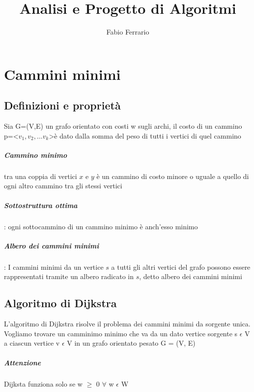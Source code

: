 \documentclass[12pt, a4paper, openany, twoside]{book}
\begin{document}
\author{Fabio Ferrario}
\title{Analisi e Progetto di Algoritmi}
\maketitle

\tableofcontents

\chapter*{Cammini minimi}

\section{Definizioni e proprietà}
Sia G=(V,E) un grafo orientato con costi w sugli archi, 
il costo di un cammino p=\textless$ v_1,v_2,...v_k$\textgreater è dato
dalla somma del peso di tutti i vertici di quel cammino

\paragraph*{Cammino minimo} tra una coppia di vertici $x$ e $y$ è un cammino di costo
minore o uguale a quello di ogni altro cammino tra gli stessi vertici

\paragraph*{Sottostruttura ottima}: ogni sottocammino di un cammino minimo è anch'esso minimo

\paragraph*{Albero dei cammini minimi}: I cammini minimi da un vertice $s$ a tutti gli altri vertici del grafo possono
essere rappresentati tramite un albero radicato in $s$, detto albero dei cammini minimi

\section{Algoritmo di Dijkstra}

L’algoritmo di Dijkstra risolve il problema dei cammini minimi da sorgente unica.\\
Vogliamo trovare un camminimo minimo che va da un dato vertice sorgente s $\epsilon$ V a ciascun vertice v $\epsilon$ V in un grafo orientato
pesato G = (V, E)

\paragraph{Attenzione}
Dijksta funziona solo se w $\geq$  0 $\forall$ w $\epsilon$ W
\end{document}

